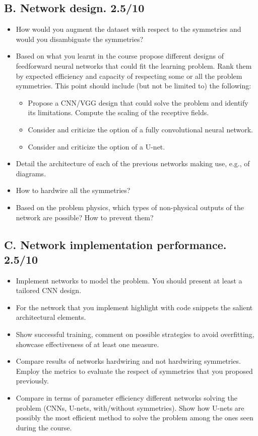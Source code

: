 \documentclass[11pt,a4paper]{article}
\begin{document}
\subsection*{B. Network design. 2.5/10}
\begin{itemize}
    \item How would you augment the dataset with respect to the symmetries and would you disambiguate the symmetries?
    \item Based on what you learnt in the course propose different designs of feedforward neural networks that could fit the learning problem. Rank them by expected efficiency and capacity of respecting some or all the problem symmetries. This point should include (but not be limited to) the following:
    \begin{itemize}
        \item Propose a CNN/VGG design that could solve the problem and identify its limitations. Compute the scaling of the receptive fields.
        \item Consider and criticize the option of a fully convolutional neural network.
        \item Consider and criticize the option of a U-net.
    \end{itemize}
    \item Detail the architecture of each of the previous networks making use, e.g., of diagrams.
    \item How to hardwire all the symmetries?
    \item Based on the problem physics, which types of non-physical outputs of the network are possible? How to prevent them?
\end{itemize}

\subsection*{C. Network implementation performance. 2.5/10}
\begin{itemize}
    \item Implement networks to model the problem. You should present at least a tailored CNN design.
    \item For the network that you implement highlight with code snippets the salient architectural elements.
    \item Show successful training, comment on possible strategies to avoid overfitting, showcase effectiveness of at least one measure.
    \item Compare results of networks hardwiring and not hardwiring symmetries. Employ the metrics to evaluate the respect of symmetries that you proposed previously.
    \item Compare in terms of parameter efficiency different networks solving the problem (CNNs, U-nets, with/without symmetries). Show how U-nets are possibly the most efficient method to solve the problem among the ones seen during the course.
\end{itemize}
\end{document}
